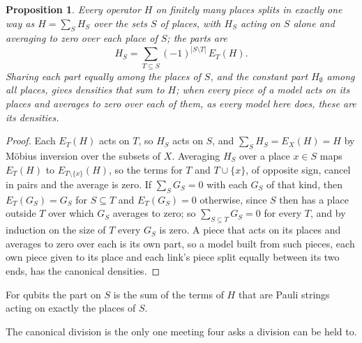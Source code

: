 \documentclass[aps,prd,reprint,superscriptaddress]{revtex4-2}
\newtheorem{proposition}{Proposition}
\begin{document}
\begin{proposition}\label{prop:canonical}
Every operator $H$ on finitely many places splits in exactly one way as $H = \sum_{S} H_S$ over the sets $S$ of places, with $H_S$ acting on $S$ alone and averaging to zero over each place of $S$; the parts are
\begin{equation}
  H_S = \sum_{T \subseteq S} (-1)^{|S \setminus T|}\, E_T(H).
  \label{eq:canonical}
\end{equation}
Sharing each part equally among the places of $S$, and the constant part $H_\emptyset$ among all places, gives densities that sum to $H$; when every piece of a model acts on its places and averages to zero over each of them, as every model here does, these are its densities.
\end{proposition}
\begin{proof}
Each $E_T(H)$ acts on $T$, so $H_S$ acts on $S$, and $\sum_S H_S = E_X(H) = H$ by Möbius inversion over the subsets of $X$. Averaging $H_S$ over a place $x \in S$ maps $E_T(H)$ to $E_{T\setminus\{x\}}(H)$, so the terms for $T$ and $T \cup \{x\}$, of opposite sign, cancel in pairs and the average is zero. If $\sum_S G_S = 0$ with each $G_S$ of that kind, then $E_T(G_S) = G_S$ for $S \subseteq T$ and $E_T(G_S) = 0$ otherwise, since $S$ then has a place outside $T$ over which $G_S$ averages to zero; so $\sum_{S \subseteq T} G_S = 0$ for every $T$, and by induction on the size of $T$ every $G_S$ is zero. A piece that acts on its places and averages to zero over each is its own part, so a model built from such pieces, each own piece given to its place and each link's piece split equally between its two ends, has the canonical densities.
\end{proof}
For qubits the part on $S$ is the sum of the terms of $H$ that are Pauli strings acting on exactly the places of $S$.

The canonical division is the only one meeting four asks a division can be held to.
\end{document}
